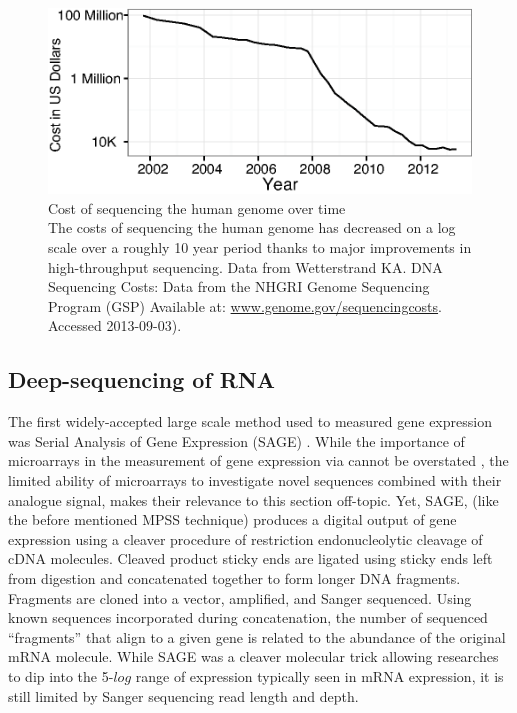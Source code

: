\begin{figure}[htbp]
	\centering 
	\includegraphics{Figures/Chapter1/Sequencing_costs_over_time.eps}
	\caption[Cost of sequencing the human genome over time]
	{
		Cost of sequencing the human genome over time\\[0.25cm]
		The costs of sequencing the human genome has decreased on a log scale over a roughly 10 year period thanks 
		to major improvements in high-throughput sequencing. Data from Wetterstrand KA. DNA Sequencing Costs: 
		Data from the NHGRI Genome Sequencing Program (GSP) Available at: \url{www.genome.gov/sequencingcosts}. Accessed 2013-09-03).
	}
	\label{fig:SeqCosts}
\end{figure}

\subsection{Deep-sequencing of RNA}

The first widely-accepted large scale method used to measured gene expression was Serial Analysis of Gene Expression (SAGE) \citep{Velculescu1995a}. While the importance of microarrays in the measurement of gene expression via cannot be overstated \citep{Shendure2008,Marioni2008}, the limited ability of microarrays to investigate novel sequences combined with their analogue signal, makes their relevance to this section off-topic. Yet, SAGE, (like the before mentioned MPSS technique) produces a digital output of gene expression using a cleaver procedure of restriction endonucleolytic cleavage of cDNA molecules. Cleaved product sticky ends are ligated using sticky ends left from digestion and concatenated together to form longer DNA fragments. Fragments are cloned into a vector, amplified, and Sanger sequenced. Using known sequences incorporated during concatenation, the number of sequenced ``fragments'' that align to a given gene is related to the abundance of the original mRNA molecule. While SAGE was a cleaver molecular trick allowing researches to dip into the 5-$log$ range of expression typically seen in mRNA expression, it is still limited by Sanger sequencing read length and depth.

